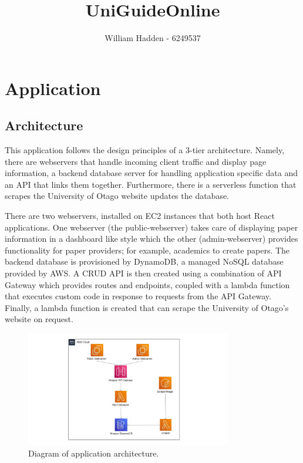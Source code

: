 \documentclass[12pt]{article}
\begin{document}
\title{UniGuideOnline \\ }

\author{William Hadden - 6249537} 

\maketitle

\section{Application}
\subsection{Architecture}

This application follows the design principles of a 3-tier architecture. Namely, there are webservers that handle incoming client traffic and display page information, a backend database server for handling application specific data and an API that links them together. Furthermore, there is a serverless function that scrapes the University of Otago website updates the database.

There are two webservers, installed on EC2 instances that both host React applications. One webserver (the public-webserver) takes care of displaying paper information in a dashboard like style which the other (admin-webserver) provides functionality for paper providers; for example, academics to create papers. The backend database is provisioned by DynamoDB, a managed NoSQL database provided by AWS. A CRUD API is then created using a combination of API Gateway which provides routes and endpoints, coupled with a lambda function that executes custom code in response to requests from the API Gateway. Finally, a lambda function is created that can scrape the University of Otago's website on request.

\begin{figure}
    \caption{Diagram of application architecture.}
    \label{fig: application_architecutre}
    \begin{center}
        \includegraphics[width=0.8\textwidth]{../docs-assets/AWS_architecture.jpg}
    \end{center} 
\end{figure}
\end{document}
